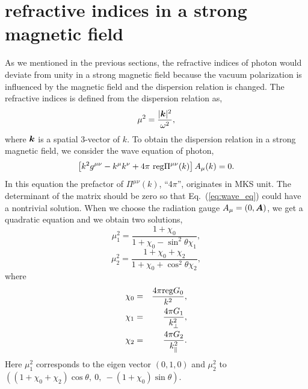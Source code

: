 \section{refractive indices in a strong magnetic field}
\label{sec:numerical}

As we mentioned in the previous sections, the refractive indices of
photon would deviate from unity in a strong magnetic field
because the vacuum polarization is influenced by the magnetic field
and the dispersion relation is changed. The refractive indices is
defined from the dispersion relation as,
\begin{equation}
    \label{eq:mu2_def}
    \mu^2 = \frac{|\mbox{\boldmath $k$}|^2}{\omega^2},
\end{equation}
where $\mbox{\boldmath $k$}$ is a spatial 3-vector of $k$.
To obtain the dispersion relation in a strong magnetic field, we
consider the wave equation of photon,
\begin{equation}
    \label{eq:wave_eq}
    \left[k^2g^{\mu\nu} - k^{\mu}k^{\nu} + 4\pi \ {\rm
      reg}\Pi^{\mu\nu}(k) \right]A_{\mu}(k) = 0.
\end{equation}
In this equation the prefactor of $\Pi^{\mu\nu}(k)$, ``4$\pi$'',
originates in MKS unit. The determinant of the matrix should be zero
so that Eq.~(\ref{eq:wave_eq}) could have a nontrivial solution. When
we choose the radiation gauge $A_{\mu} = (0, \mbox{\boldmath $A$})$, we get a
quadratic equation and we obtain two solutions,
\begin{equation}
    \label{eq:mu2_1}
    \mu^2_1 = \frac{1+\chi_0}{1+\chi_0-\sin^2\theta \chi_1},
\end{equation}
\begin{equation}
    \label{eq:mu2_2}
    \mu^2_2 = \frac{1+\chi_0+\chi_2}{1+\chi_0 + \cos^2\theta \chi_2},
\end{equation}
where
\begin{eqnarray}
    \label{eq:chi_0}
    \chi_0 &=& \frac{4\pi {\rm reg}G_0}{k^2}, \\
    \label{eq:chi_1}
    \chi_1 &=& \frac{4\pi G_1}{k_{\perp}^2}, \\
    \label{eq:chi_2}
    \chi_2 &=& \frac{4\pi G_2}{k_{\parallel}^2}.
\end{eqnarray}
Here $\mu_1^2$ corresponds to the eigen vector $\left(0,1,0\right)$
and $\mu_2^2$ to $\left((1+\chi_0+\chi_2)\cos\theta, \ 0,
  \ - (1+\chi_0)\sin\theta\right)$.

